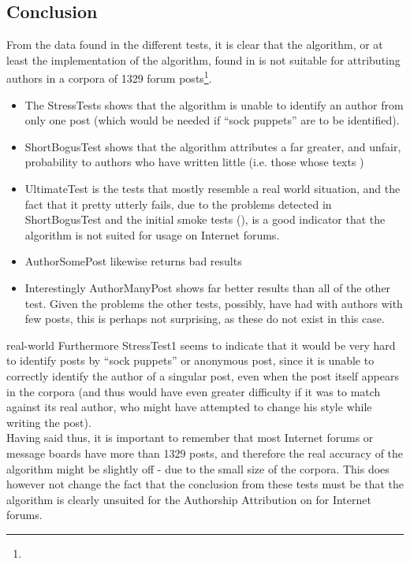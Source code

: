 \subsection{Conclusion}
From the data found in the different tests, it is clear that the algorithm, or at least the implementation of the algorithm, found in \cite{nr4} is not suitable for attributing authors in a corpora of 1329 forum posts\footnote{}. 
\begin{itemize}
\item The StressTests shows that the algorithm is unable to identify an author from only one post (which would be needed if ``sock puppets'' are to be identified). 
\item ShortBogusTest shows that the algorithm attributes a far greater, and unfair, probability to authors who have written little (i.e. those whose texts )
\item UltimateTest is the tests that mostly resemble a real world situation, and the fact that it pretty utterly fails, due to the problems detected in ShortBogusTest and the initial smoke tests (), is a good indicator that the algorithm is not suited for usage on Internet forums.
\item AuthorSomePost likewise returns bad results 
\item Interestingly AuthorManyPost shows far better results than all of the other test. Given the problems the other tests, possibly, have had with authors with few posts, this is perhaps not surprising, as these do not exist in this case.
\end{itemize}real-world 
Furthermore StressTest1 seems to indicate that it would be very hard to identify posts by ``sock puppets'' or anonymous post, since it is unable to correctly identify the author of a singular post, even when the post itself appears in the corpora (and thus would have even greater difficulty if it was to match against its real author, who might have attempted to change his style while writing the post).\\ 

Having said thus, it is important to remember that most Internet forums or message boards have more than 1329 posts, and therefore the real accuracy of the algorithm might be slightly off - due to the small size of the corpora. This does however not change the fact that the conclusion from these tests must be that the algorithm is clearly unsuited for the Authorship Attribution on for Internet forums.
